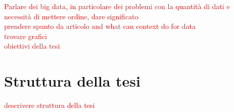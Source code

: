 \textcolor{red}{Parlare dei big data, in particolare dei problemi con la quantità di dati e necessità di mettere ordine, dare significato\\
	prendere spunto da articolo and what can context do for data\\
	trovare grafici\\
	obiettivi della tesi}

\section{Struttura della tesi\label{sec:struttura-tesi}}

\textcolor{red}{descrivere struttura della tesi}